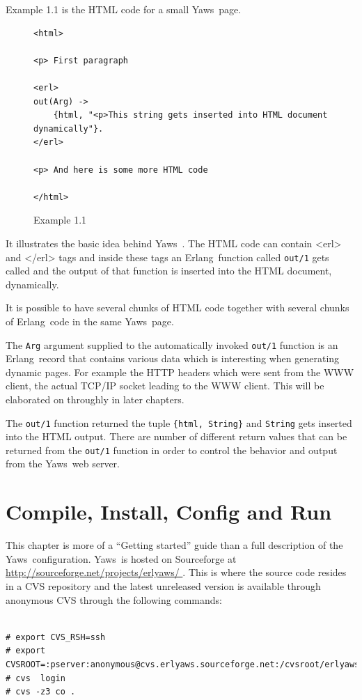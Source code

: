 \documentclass[11pt,oneside,english]{book}
\newcommand{\Erlang}            %
        {{\sc Erlang}}
\newcommand{\Yaws}            %
        {{\sc Yaws}}
\begin{document}
Example 1.1 is the HTML code for a small \Yaws\  page.


\begin{figure}[h]
\begin{verbatim}
<html>

<p> First paragraph

<erl>
out(Arg) ->
    {html, "<p>This string gets inserted into HTML document dynamically"}.
</erl>

<p> And here is some more HTML code

</html>
\end{verbatim}
\caption{Example 1.1}
\end{figure}

It illustrates the basic idea behind \Yaws\ . The HTML code
can contain <erl> and </erl> tags and inside these tags an \Erlang\  function
called \verb+out/1+ gets called and the output of that function is inserted
into the HTML document, dynamically.

It is possible to have several chunks of HTML code together with several
chunks of \Erlang\  code in the same \Yaws\  page.

The \verb+Arg+ argument supplied to the automatically invoked \verb+out/1+
function is an \Erlang\  record that contains various data which is interesting
when generating dynamic pages. For example the HTTP headers which were sent
from the WWW client, the actual TCP/IP socket leading to the WWW client.
This will be elaborated on throughly in later chapters.

The \verb+out/1+ function returned the tuple \verb+{html, String}+ and
\verb+String+ gets inserted into the HTML output. There are number
of different return values that can be returned from the \verb+out/1+ function
in order to control the behavior and output from the \Yaws\  web server.



\chapter{Compile, Install, Config and Run}

This chapter is more of a ``Getting started'' guide than a full
description of the \Yaws\  configuration.
\Yaws\  is hosted on Sourceforge at
\url{ http://sourceforge.net/projects/erlyaws/ }. This is where the source code
resides in a CVS repository and the latest unreleased version is
available through anonymous CVS through the following commands:

\begin{verbatim}

# export CVS_RSH=ssh
# export CVSROOT=:pserver:anonymous@cvs.erlyaws.sourceforge.net:/cvsroot/erlyaws
# cvs  login
# cvs -z3 co .

\end{verbatim}
\end{document}
